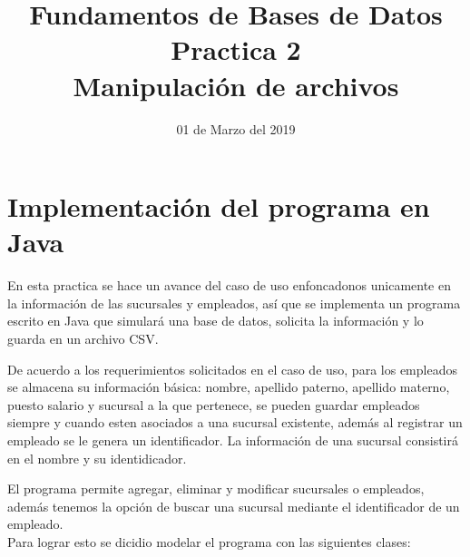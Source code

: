 \documentclass[10pt]{article}
\begin{document}
    \title{Fundamentos de Bases de Datos \\
        Practica 2\\ Manipulación de archivos
        } 
    \author{}
    \date{01 de Marzo del 2019}
    \maketitle
    
    \section{Implementación del programa en Java}\vspace{0.5cm}
    En esta practica se hace un avance del caso de uso enfoncadonos unicamente en la información de las sucursales y empleados, así que se implementa  un programa escrito en Java que simulará una base de datos, solicita la información y lo guarda en un archivo CSV.
    
    De acuerdo a los requerimientos solicitados en el caso de uso, para los empleados se almacena su información básica: nombre, apellido paterno, apellido materno, puesto salario y sucursal a la que pertenece, se pueden guardar empleados siempre y cuando esten asociados a una sucursal existente, además al registrar un empleado se le genera  un identificador. La información de una sucursal consistirá en el nombre y su identidicador.
    
    El programa permite agregar, eliminar y modificar sucursales o empleados, además tenemos
    la opción de buscar una sucursal mediante el identificador de un empleado.\\
    
    
    Para lograr esto se dicidio modelar el programa con las siguientes clases:
    
\end{document}
